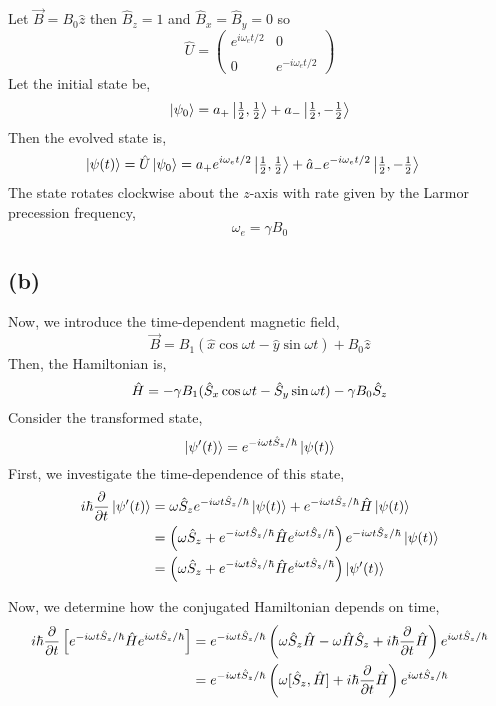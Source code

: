 \documentclass[12pt]{extarticle}
\begin{document}
Let $\vec{B} = B_0 \hat{z}$ then $\hat{B}_z = 1$ and $\hat{B}_x = \hat{B}_y = 0$ so
\[ \hat{U} = 
\begin{pmatrix}
e^{i \omega_{e} t /2} & 0 \\ \\
0  & e^{-i \omega_{e} t /2}
\end{pmatrix}
\]
Let the initial state be, 
\[\left| \psi_0 \right> = a_{+} \left| \tfrac{1}{2}, \tfrac{1}{2} \right> + a_{-} \left| \tfrac{1}{2}, - \tfrac{1}{2} \right> \]
Then the evolved state is,
\begin{align*}
\left| \psi(t) \right> = \hat{U} \left| \psi_0 \right> & = a_{+} e^{i \omega_{e} t /2} \left| \tfrac{1}{2}, \tfrac{1}{2} \right> + \hat{a}_{-} e^{- i \omega_{e} t /2} \left| \tfrac{1}{2}, - \tfrac{1}{2} \right> 
\end{align*}
The state rotates clockwise about the $z$-axis with rate given by the Larmor precession frequency, \[\omega_{e} = \gamma B_0\]


\subsection*{(b)}
Now, we introduce the time-dependent magnetic field,
\[\vec{B} = B_1 \left(\hat{x} \cos{\omega t} - \hat{y} \sin{\omega t} \right) + B_0 \hat{z} \]
Then, the Hamiltonian is,
\[\hat{H} = - \gamma B_1 (\hat{S}_x \cos{\omega t} - \hat{S}_y \sin{\omega t}) - \gamma B_0 \hat{S}_z \]
Consider the transformed state,
\[ \left| \psi'(t) \right> = e^{-i \omega t \hat{S}_z / \hbar} \left| \psi(t) \right>\] 
First, we investigate the time-dependence of this state,
\begin{align*}
i\hbar \frac{\partial{}}{\partial{t}} \left| \psi'(t) \right> & = \omega \hat{S}_z e^{-i \omega t \hat{S}_z / \hbar} \left| \psi(t) \right> + e^{-i \omega t \hat{S}_z / \hbar} \hat{H} \left| \psi(t) \right>  \\ & = \left(\omega \hat{S}_z + e^{-i \omega t \hat{S}_z / \hbar} \hat{H} e^{i \omega t \hat{S}_z / \hbar} \right) e^{-i \omega t \hat{S}_z / \hbar} \left| \psi(t) \right> \\ & = \left(\omega \hat{S}_z + e^{-i \omega t \hat{S}_z / \hbar} \hat{H} e^{i \omega t \hat{S}_z / \hbar} \right) \left| \psi'(t) \right> 
\end{align*}

Now, we determine how the conjugated Hamiltonian depends on time,
\begin{align*}
i \hbar \frac{\partial{}}{\partial{t}} \left[ e^{-i \omega t \hat{S}_z / \hbar} \hat{H} e^{i \omega t \hat{S}_z / \hbar} \right] & = e^{-i \omega t \hat{S}_z / \hbar} \left( \omega \hat{S}_z \hat{H} - \omega  \hat{H} \hat{S}_z + i \hbar \frac{\partial{}}{\partial{t}} \hat{H} \right) e^{i \omega t \hat{S}_z / \hbar} \\ & = e^{-i \omega t \hat{S}_z / \hbar} \left( \omega [\hat{S}_z, \hat{H}] + i \hbar \frac{\partial{}}{\partial{t}} \hat{H} \right) e^{i \omega t \hat{S}_z / \hbar}
\end{align*} 
\end{document}
